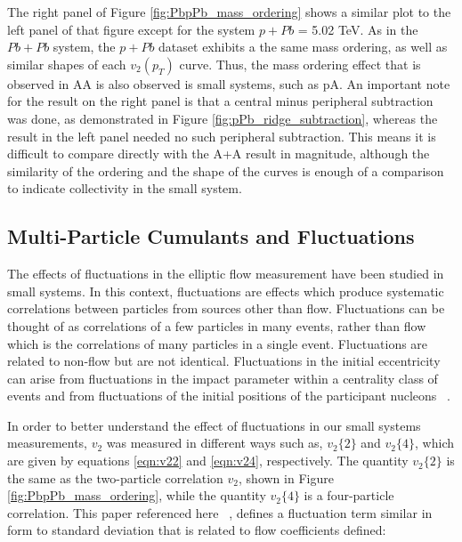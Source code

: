 The right panel of Figure \ref{fig:PbpPb_mass_ordering} shows a similar plot to the left panel of that figure except for the system $p+Pb$ \sqsn = 5.02 TeV. As in the $Pb+Pb$ system, the $p+Pb$ dataset exhibits a the same mass ordering, as well as similar shapes of each $v_2(p_T)$ curve. Thus, the mass ordering effect that is observed in AA is also observed is small systems, such as pA. An important note for the result on the right panel is that a central minus peripheral subtraction was done, as demonstrated in Figure \ref{fig:pPb_ridge_subtraction}, whereas the result in the left panel needed no such peripheral subtraction. This means it is difficult to compare directly with the A+A result in magnitude, although the similarity of the ordering and the shape of the curves is enough of a comparison to indicate collectivity in the small system.


\subsection{Multi-Particle Cumulants and Fluctuations}
The effects of fluctuations in the elliptic flow measurement have been studied in small systems. In this context, fluctuations are effects which produce systematic correlations between particles from sources other than flow. Fluctuations can be thought of as correlations of a few particles in many events, rather than flow which is the correlations of many particles in a single event. Fluctuations are related to non-flow but are not identical. Fluctuations in the initial eccentricity can arise from fluctuations in the impact parameter within a centrality class of events and from fluctuations of the initial positions of the participant nucleons ~\cite{PhysRevC.80.014904}.

In order to better understand the effect of fluctuations in our small systems measurements, $v_2$ was measured in different ways such as, $v_2\{2\}$ and $v_2\{4\}$, which are given by equations \ref{eqn:v22} and \ref{eqn:v24}, respectively. The quantity $v_2\{2\}$ is the same as the two-particle correlation $v_2$, shown in Figure \ref{fig:PbpPb_mass_ordering}, while the quantity $v_2\{4\}$ is a four-particle correlation. This paper referenced here ~\cite{PhysRevC.80.014904}, defines a fluctuation term similar in form to standard deviation that is related to flow coefficients defined:

